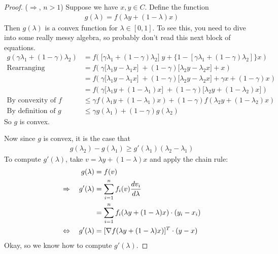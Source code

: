 \documentclass[12pt]{book}
\numberwithin{equation}{section} %
\theoremstyle{plain}
\theoremstyle{definition}
\theoremstyle{remark}
\newcommand{\sumin}{\sum^n_{i=1}}
\begin{document}
\begin{proof}
($\Rightarrow$, $n>1$)
Suppose we have $x,y\in C$. Define the function
\begin{align}
  g(\lambda) = f(\lambda y + (1-\lambda)x)
  \label{eq:gdef}
\end{align}
Then $g(\lambda)$ is a convex function for $\lambda\in [0,1]$.
To see this, you need to dive into some really messy algebra, so
probably don't read this next block of equations.
\begin{align*}
  g(\gamma \lambda_1 + (1-\gamma) \lambda_2)
  &=
  f\big(\; \big[\gamma \lambda_1 + (1-\gamma) \lambda_2\big] \; y
  + \big\{1 - [\gamma \lambda_1 + (1-\gamma) \lambda_2]\big\} x
  \;\big)\\
  \text{Rearranging} \qquad
  &=
  f\big(\;
  \gamma \big[\lambda_1 y - \lambda_1 x\big] \;
  +(1-\gamma)\big[ \lambda_2 y -\lambda_2 x \big]
  +  x
  \;\big)\\
  &=
  f\big(\;
  \gamma \big[\lambda_1 y - \lambda_1 x\big] \;
  +(1-\gamma)\big[ \lambda_2 y -\lambda_2 x \big]
  +  \gamma x + (1-\gamma) x
  \;\big)\\
  &=
  f\big(\;
  \gamma \big[\lambda_1 y + (1- \lambda_1 )x\big] \;
  +(1-\gamma)\big[ \lambda_2 y + (1-\lambda_2) x \big]
  \;\big)\\
  \text{By convexity of $f$}\qquad
  &\leq
  \gamma f(\lambda_1 y + (1- \lambda_1 )x)
  +(1-\gamma)f(\lambda_2 y + (1-\lambda_2) x)
  \\
  \text{By definition of $g$}\qquad
  &\leq
  \gamma g(\lambda_1)
  +(1-\gamma)g(\lambda_2)
\end{align*}
So $g$ is convex.

Now since $g$ is convex, it is the case that
\begin{align}
  g(\lambda_2) - g(\lambda_1)
  \geq g'(\lambda_1)(\lambda_2-\lambda_1)
  \label{ineq:glambda}
\end{align}
To compute $g'(\lambda)$, take $v=\lambda y + (1-\lambda) x$ and apply
the chain rule:
\begin{align}
  g(\lambda) &= f(v)\notag\\
  \Rightarrow\quad
  g'(\lambda)
  &= \sumin f_i(v) \frac{dv_i}{d\lambda}\notag \\
  &= \sumin f_i(\lambda y + (1-\lambda)x) \cdot (y_i-x_i) \notag\\
  \Leftrightarrow \quad
  g'(\lambda)
  &= [\nabla f(\lambda y + (1-\lambda)x)]^T\cdot (y-x)
  \label{eq:gprimelambda}
\end{align}
Okay, so we know how to compute $g'(\lambda)$.


\end{proof}
\end{document}
